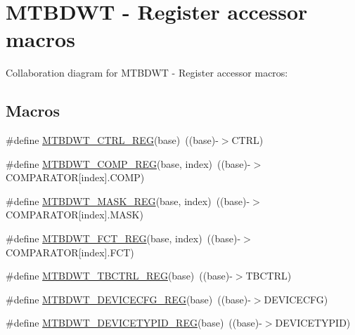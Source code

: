 \hypertarget{group___m_t_b_d_w_t___register___accessor___macros}{}\section{M\+T\+B\+D\+WT -\/ Register accessor macros}
\label{group___m_t_b_d_w_t___register___accessor___macros}
Collaboration diagram for M\+T\+B\+D\+WT -\/ Register accessor macros\+:
\subsection*{Macros}
\begin{DoxyCompactItemize}
\item 
\#define \hyperlink{group___m_t_b_d_w_t___register___accessor___macros_gab63fe70f69879777db30d18d5407e158}{M\+T\+B\+D\+W\+T\+\_\+\+C\+T\+R\+L\+\_\+\+R\+EG}(base)~((base)-\/$>$C\+T\+RL)
\item 
\#define \hyperlink{group___m_t_b_d_w_t___register___accessor___macros_ga0204594297d9a6d44fe19d610913a7aa}{M\+T\+B\+D\+W\+T\+\_\+\+C\+O\+M\+P\+\_\+\+R\+EG}(base,  index)~((base)-\/$>$C\+O\+M\+P\+A\+R\+A\+T\+OR\mbox{[}index\mbox{]}.C\+O\+MP)
\item 
\#define \hyperlink{group___m_t_b_d_w_t___register___accessor___macros_ga32be33e09a6c10c58485d2beefb6facf}{M\+T\+B\+D\+W\+T\+\_\+\+M\+A\+S\+K\+\_\+\+R\+EG}(base,  index)~((base)-\/$>$C\+O\+M\+P\+A\+R\+A\+T\+OR\mbox{[}index\mbox{]}.M\+A\+SK)
\item 
\#define \hyperlink{group___m_t_b_d_w_t___register___accessor___macros_ga6bb0978c19eed749885efdb3c899edab}{M\+T\+B\+D\+W\+T\+\_\+\+F\+C\+T\+\_\+\+R\+EG}(base,  index)~((base)-\/$>$C\+O\+M\+P\+A\+R\+A\+T\+OR\mbox{[}index\mbox{]}.F\+CT)
\item 
\#define \hyperlink{group___m_t_b_d_w_t___register___accessor___macros_ga42ec173a2526de3b3d082bd99a19b6a5}{M\+T\+B\+D\+W\+T\+\_\+\+T\+B\+C\+T\+R\+L\+\_\+\+R\+EG}(base)~((base)-\/$>$T\+B\+C\+T\+RL)
\item 
\#define \hyperlink{group___m_t_b_d_w_t___register___accessor___macros_ga918d93e20e19d7e33c59ebd700dc5f74}{M\+T\+B\+D\+W\+T\+\_\+\+D\+E\+V\+I\+C\+E\+C\+F\+G\+\_\+\+R\+EG}(base)~((base)-\/$>$D\+E\+V\+I\+C\+E\+C\+FG)
\item 
\#define \hyperlink{group___m_t_b_d_w_t___register___accessor___macros_gae85feea5348b4fe3e3084e1a58b556fd}{M\+T\+B\+D\+W\+T\+\_\+\+D\+E\+V\+I\+C\+E\+T\+Y\+P\+I\+D\+\_\+\+R\+EG}(base)~((base)-\/$>$D\+E\+V\+I\+C\+E\+T\+Y\+P\+ID)

\end{DoxyCompactItemize}
